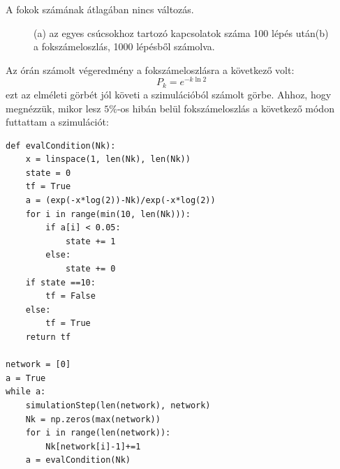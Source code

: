 \documentclass[12pt]{article}
\begin{document}
A fokok számának átlagában nincs változás.
 \begin{figure}[H]
\centering     
{}

\caption{(a) az egyes csúcsokhoz tartozó kapcsolatok száma 100 lépés után(b) a fokszámeloszlás, 1000 lépésből számolva.}
\label{fig: k}
\end{figure}

Az órán számolt végeredmény a fokszámeloszlásra a következő volt:
$$P_k = e^{-k\ln{2}}$$
ezt az elméleti görbét jól követi a szimulációból számolt görbe. Ahhoz, hogy megnézzük, mikor lesz $5\%$-os hibán belül  fokszámeloszlás a következő  módon futtattam a szimulációt:
\begin{lstlisting}
def evalCondition(Nk):
    x = linspace(1, len(Nk), len(Nk))
    state = 0
    tf = True
    a = (exp(-x*log(2))-Nk)/exp(-x*log(2))
    for i in range(min(10, len(Nk))):
        if a[i] < 0.05:
            state += 1
        else:
            state += 0
    if state ==10:
        tf = False
    else:
        tf = True
    return tf
    
network = [0]
a = True
while a:
    simulationStep(len(network), network)
    Nk = np.zeros(max(network))
    for i in range(len(network)):
        Nk[network[i]-1]+=1
    a = evalCondition(Nk)

\end{lstlisting}
 
\end{document}
